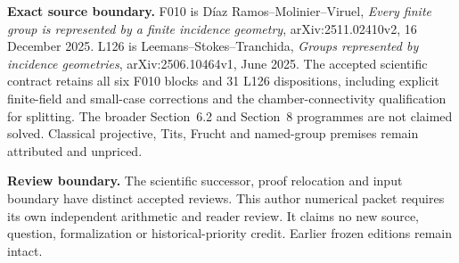 \documentclass[11pt]{article}
\begin{document}
\textbf{Exact source boundary.} F010 is D\'iaz Ramos--Molinier--Viruel,
\emph{Every finite group is represented by a finite incidence geometry},
arXiv:2511.02410v2, 16 December 2025. L126 is Leemans--Stokes--Tranchida,
\emph{Groups represented by incidence geometries},
arXiv:2506.10464v1, June 2025. The accepted scientific contract retains
all six F010 blocks and 31 L126 dispositions, including explicit
finite-field and small-case corrections and the chamber-connectivity
qualification for splitting. The broader Section~6.2 and Section~8
programmes are not claimed solved. Classical projective, Tits, Frucht
and named-group premises remain attributed and unpriced.

\textbf{Review boundary.} The scientific successor, proof relocation
and input boundary have distinct accepted reviews. This author numerical
packet requires its own independent arithmetic and reader review.
It claims no new source, question, formalization or historical-priority
credit. Earlier frozen editions remain intact.
\end{document}
